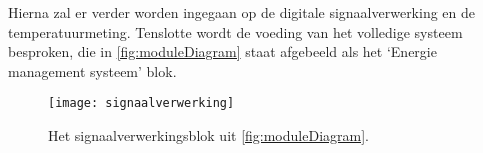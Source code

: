 Hierna zal er verder worden ingegaan op de digitale signaalverwerking en de temperatuurmeting. Tenslotte wordt de voeding van het volledige systeem besproken, die in \cref{fig:moduleDiagram} staat afgebeeld als het `Energie management systeem' blok.

\begin{figure}[!htbp]
    \centering
    \texttt{[image: signaalverwerking]}
    \caption{Het signaalverwerkingsblok uit \cref{fig:moduleDiagram}.}
    \label{fig:analogeBewerkingsFunctie}
\end{figure}













%
